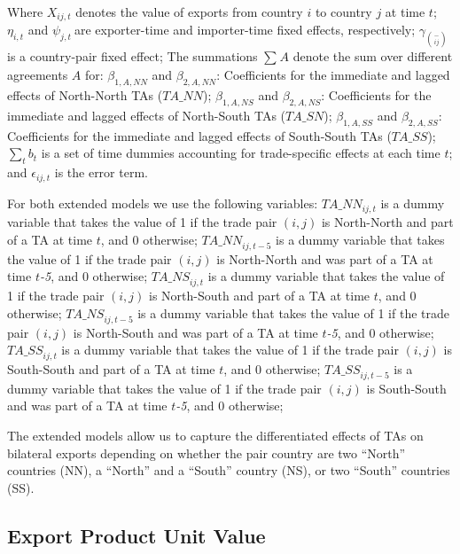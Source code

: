 Where \(X_{ij,t}\)\hspace{0pt} denotes the value of exports from country
\(i\) to country \(j\) at time \(t\); \(\eta_{i,t}\) and
\(\psi_{j,t}\ \)are exporter-time and importer-time fixed effects,
respectively; \(\gamma_{\binom{-}{ij}}\) is a country-pair fixed effect;
The summations \hspace{0pt}\(\sum_{}^{}A\) denote the sum over different
agreements \(A\) for: \(\beta_{1,A,NN}\) and \(\beta_{2,A,NN}\):
Coefficients for the immediate and lagged effects of North-North TAs
\hspace{0pt}(\(TA\_ NN\)); \(\beta_{1,A,NS}\) and \(\beta_{2,A,NS}\):
Coefficients for the immediate and lagged effects of North-South TAs
(\(TA\_ SN\)); \(\beta_{1,A,SS}\) and \(\beta_{2,A,SS}\): Coefficients
for the immediate and lagged effects of South-South TAs (\(TA\_ SS\));
\(\sum_{t}^{}b_{t}\) is a set of time dummies accounting for
trade-specific effects at each time \(t\); and \(\epsilon_{ij,t}\) is
the error term.

For both extended models we use the following variables:
\({TA\_ NN}_{ij,t}\) is a dummy variable that takes the value of 1 if
the trade pair \((i,j)\) is North-North and part of a TA at time \(t\),
and 0 otherwise; \({TA\_ NN}_{ij,t - 5}\) is a dummy variable that takes
the value of 1 if the trade pair \((i,j)\) is North-North and was part
of a TA at time \(t\)\emph{-5}, and 0 otherwise; \({TA\_ NS}_{ij,t}\) is
a dummy variable that takes the value of 1 if the trade pair \((i,j)\)
is North-South and part of a TA at time \(t\), and 0 otherwise;
\({TA\_ NS}_{ij,t - 5}\) is a dummy variable that takes the value of 1
if the trade pair \((i,j)\) is North-South and was part of a TA at time
\(t\)\emph{-5}, and 0 otherwise; \({TA\_ SS}_{ij,t}\) is a dummy
variable that takes the value of 1 if the trade pair \((i,j)\) is
South-South and part of a TA at time \(t\), and 0 otherwise;
\({TA\_ SS}_{ij,t - 5}\) is a dummy variable that takes the value of 1
if the trade pair \((i,j)\) is South-South and was part of a TA at time
\(t\)\emph{-5}, and 0 otherwise;

The extended models allow us to capture the differentiated effects of
TAs on bilateral exports depending on whether the pair country are two
``North'' countries (NN), a ``North'' and a ``South'' country (NS), or
two ``South'' countries (SS).

%
\subsection{Export Product Unit Value}%
\label{subsec:ExportProductUnitValue}%

